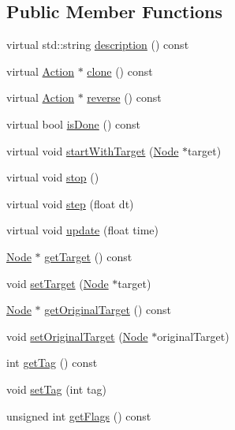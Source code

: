 \subsection*{Public Member Functions}
\begin{DoxyCompactItemize}
\item 
virtual std\+::string \hyperlink{classAction_ab593241dbcf25a8ac9160d6eb9d1c247}{description} () const
\item 
virtual \hyperlink{classAction}{Action} $\ast$ \hyperlink{classAction_a6a047ad6b3bd200b0f86c7bb519b31ea}{clone} () const
\item 
virtual \hyperlink{classAction}{Action} $\ast$ \hyperlink{classAction_a2f06b574c4f066a3f11854a77c456227}{reverse} () const
\item 
virtual bool \hyperlink{classAction_a9b5dd627540a85f89f3e82acd46b7772}{is\+Done} () const
\item 
virtual void \hyperlink{classAction_a5457090e4a035c6283777c893a9a681b}{start\+With\+Target} (\hyperlink{classNode}{Node} $\ast$target)
\item 
virtual void \hyperlink{classAction_a968267fa7a1dcc46a2976249a712d3c8}{stop} ()
\item 
virtual void \hyperlink{classAction_a9a64ee9e8e977672748f70893ebaff66}{step} (float dt)
\item 
virtual void \hyperlink{classAction_a937e646e63915e33ad05ba149bfcf239}{update} (float time)
\item 
\hyperlink{classNode}{Node} $\ast$ \hyperlink{classAction_a696d1ef82807cc18207ba93d59d6ca16}{get\+Target} () const
\item 
void \hyperlink{classAction_abd61e00e97d9604126cf149112b877de}{set\+Target} (\hyperlink{classNode}{Node} $\ast$target)
\item 
\hyperlink{classNode}{Node} $\ast$ \hyperlink{classAction_a50cdb52f323c6756ec300e4d0f86596a}{get\+Original\+Target} () const
\item 
void \hyperlink{classAction_aa58699929e174e97a057b51e83fcc1f3}{set\+Original\+Target} (\hyperlink{classNode}{Node} $\ast$original\+Target)
\item 
int \hyperlink{classAction_a1f090a477cab2dbc8175385c66b91c31}{get\+Tag} () const
\item 
void \hyperlink{classAction_ac23487f50607b5acef33c1aa7dd9468e}{set\+Tag} (int tag)
\item 
unsigned int \hyperlink{classAction_aabe5706c0cc66d461b14558728dccf01}{get\+Flags} () const
\item 

\end{DoxyCompactItemize}
